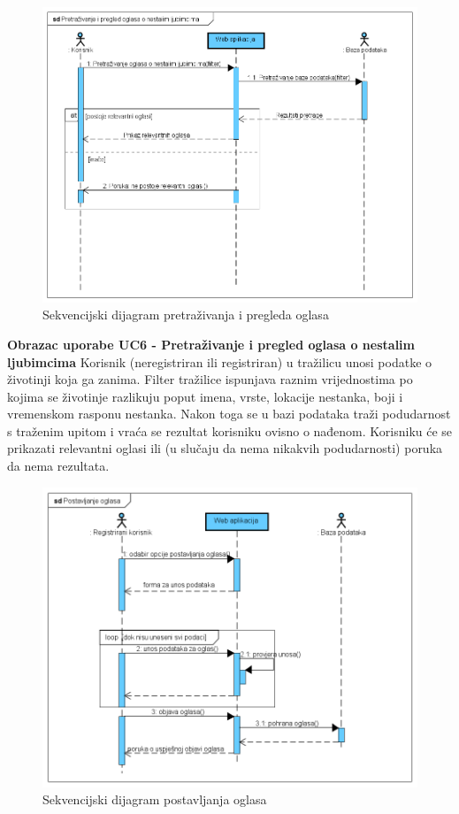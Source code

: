 			\begin{figure}[H]
				\includegraphics[scale=0.6]{slike/seq_pretrazivanje_pregled_oglasa.PNG} 
				\centering
				\caption{Sekvencijski dijagram pretraživanja i pregleda oglasa}
				\label{seq_pretrazivanje_pregled_oglasa}
			\end{figure}
			
			\noindent\textbf{Obrazac uporabe UC6 - Pretraživanje i pregled oglasa o nestalim ljubimcima}\newline
			\noindent Korisnik (neregistriran ili registriran) u tražilicu unosi podatke o životinji koja ga zanima. Filter tražilice ispunjava raznim vrijednostima po kojima se životinje razlikuju poput imena, vrste, lokacije nestanka, boji i vremenskom rasponu nestanka. Nakon toga se u bazi podataka traži podudarnost s traženim upitom i vraća se rezultat korisniku ovisno o nađenom. Korisniku će se prikazati relevantni oglasi ili (u slučaju da nema nikakvih podudarnosti) poruka da nema rezultata.
			
			
			\begin{figure}[H]
				\includegraphics[scale=0.6]{slike/seq_postavljanje_oglasa.PNG} 
				\centering
				\caption{Sekvencijski dijagram postavljanja oglasa}
				\label{seq_postavljanje_oglasa}
			\end{figure}
			
